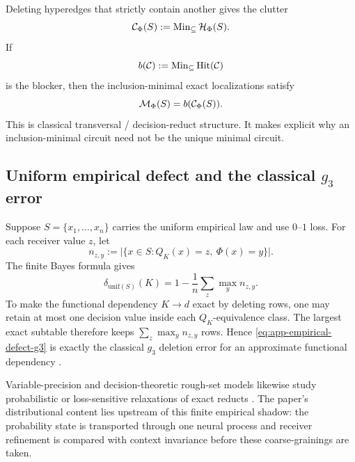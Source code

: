 Deleting hyperedges that strictly contain another gives the clutter
\[
\mathcal{C}_\Phi(S):=\operatorname{Min}_{\subseteq}\mathcal{H}_\Phi(S).
\]
If
\[
b(\mathcal{C}):=\operatorname{Min}_{\subseteq}\operatorname{Hit}(\mathcal{C})
\]
is the blocker, then the inclusion-minimal exact localizations satisfy
\begin{equation}
\mathcal{M}_\Phi(S)=b(\mathcal{C}_\Phi(S)).
\label{eq:app-minimal-localizations-blocker-shadow}
\end{equation}
This is classical transversal / decision-reduct structure. It makes explicit why an inclusion-minimal circuit need not be the unique minimal circuit.

\subsection{Uniform empirical defect and the classical \texorpdfstring{$g_3$}{g3} error}

Suppose $S=\{x_1,\ldots,x_n\}$ carries the uniform empirical law and use $0$--$1$ loss. For each receiver value $z$, let
\[
n_{z,y}
:=
\bigl|\{x\in S:Q_K(x)=z,\ \Phi(x)=y\}\bigr|.
\]
The finite Bayes formula gives
\begin{equation}
\delta_{\mathrm{unif}(S)}(K)
=
1-\frac1n\sum_z\max_y n_{z,y}.
\label{eq:app-empirical-defect-g3}
\end{equation}
To make the functional dependency $K\to d$ exact by deleting rows, one may retain at most one decision value inside each $Q_K$-equivalence class. The largest exact subtable therefore keeps $\sum_z\max_y n_{z,y}$ rows. Hence \eqref{eq:app-empirical-defect-g3} is exactly the classical $g_3$ deletion error for an approximate functional dependency \citep{kivinen1995approximate}.

Variable-precision and decision-theoretic rough-set models likewise study probabilistic or loss-sensitive relaxations of exact reducts \citep{ziarko1993variable,zhao2008attribute}. The paper's distributional content lies upstream of this finite empirical shadow: the probability state is transported through one neural process and receiver refinement is compared with context invariance before these coarse-grainings are taken.
